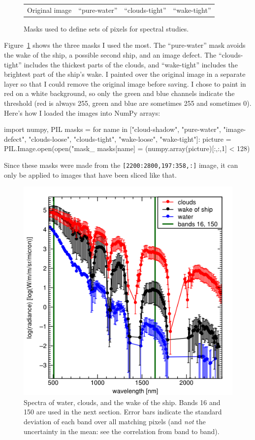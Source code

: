 \documentclass[12pt]{article}
\begin{document}
\begin{figure}
\begin{center}
\begin{tabular}{c c c c}
Original image & ``pure-water'' & ``clouds-tight'' & ``wake-tight''
\end{tabular}
\end{center}
\caption{Masks used to define sets of pixels for spectral studies. \label{masks}}
\end{figure}

Figure~\ref{masks} shows the three masks I used the most.  The
``pure-water'' mask avoids the wake of the ship, a possible second
ship, and an image defect.  The ``clouds-tight'' includes the thickest
parts of the clouds, and ``wake-tight'' includes the brightest part of
the ship's wake.  I painted over the original image in a separate
layer so that I could remove the original image before saving.  I
chose to paint in red on a white background, so only the green and
blue channels indicate the threshold (red is always 255, green and
blue are sometimes 255 and sometimes 0).  Here's how I loaded the images into NumPy arrays:
\begin{python}
import numpy, PIL
masks = {}
for name in ["cloud-shadow", "pure-water", "image-defect",
            "clouds-loose", "clouds-tight", "wake-loose", "wake-tight"]:
    picture = PIL.Image.open(open("mask_%
    masks[name] = (numpy.array(picture)[:,:,1] < 128)
\end{python}
Since these masks were made from the {\tt [2200:2800,197:358,:]} image,
it can only be applied to images that have been sliced like that.

\begin{figure}[!b]
\begin{center}
\includegraphics[width=0.75\linewidth]{plots_threespectra.png}
\end{center}
\caption{Spectra of water, clouds, and the wake of the ship.  Bands
  16 and 150 are used in the next section.  Error bars indicate the
  standard deviation of each band over all matching pixels (and {\it
    not} the uncertainty in the mean: see the correlation from band to
  band). \label{plots_threespectra}}
\end{figure}
\end{document}

